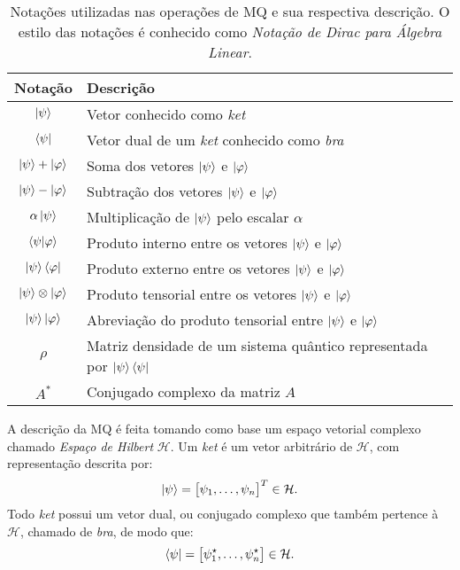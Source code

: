 \begin{table}[ht!]
  \centering
  \caption{Notações utilizadas nas operações de MQ e sua respectiva descrição. O estilo das notações é conhecido como \textit{Notação de Dirac para Álgebra Linear}.}\label{tab:notação}
  \begin{tabular}{cl}
    \toprule
    Notação                   & Descrição                                                   \\
    \midrule
    $\ket{\psi}$                       & Vetor conhecido como \textit{ket}                                    \\
    $\bra{\psi}$                       & Vetor dual de um \textit{ket} conhecido como \textit{bra}            \\
    $\ket{\psi} + \ket{\varphi}$       & Soma dos vetores $\ket{\psi}$ e $\ket{\varphi}$  \\
    $\ket{\psi} - \ket{\varphi}$       & Subtração dos vetores $\ket{\psi}$ e $\ket{\varphi}$  \\
    $\alpha \ket{\psi}$                & Multiplicação de $\ket{\psi}$ pelo escalar $\alpha$ \\
    $\braket{\psi|\varphi}$            & Produto interno entre os vetores $\ket{\psi}$ e $\ket{\varphi}$      \\
    $\ket{\psi}\bra{\varphi}$          & Produto externo entre os vetores $\ket{\psi}$ e $\ket{\varphi}$ \\
    $\ket{\psi} \otimes \ket{\varphi}$ & Produto tensorial entre os vetores $\ket{\psi}$ e $\ket{\varphi}$    \\
    $\ket{\psi}\ket{\varphi}$          & Abreviação do produto tensorial entre $\ket{\psi}$ e $\ket{\varphi}$ \\
    $\rho$                             & Matriz densidade de um sistema quântico representada por $\ket{\psi}\bra{\psi}$ \\
    $A^*$                              & Conjugado complexo da matriz \(A\)                                   \\
    \bottomrule
  \end{tabular}
\end{table}

A descrição da MQ é feita tomando como base um espaço vetorial complexo chamado \textit{Espaço de Hilbert} $\mathcal{H}$. Um \textit{ket} é um vetor arbitrário de $\mathcal{H}$, com representação descrita por:
\begin{equation}\label{eq:ketpsi}
  \ket{\psi} = \bigl[\psi_1,\ldots,\psi_n\bigr]^{T} \in \mathcal{H}.
\end{equation}
Todo \textit{ket} possui um vetor dual, ou conjugado complexo que também pertence à $\mathcal{H}$, chamado de \textit{bra}, de modo que:
\begin{equation}\label{eq:brapsi}
  \bra{\psi} = \bigl[\psi_1^{\star},\ldots,\psi_n^{\star}\bigr] \in \mathcal{H}.
\end{equation}

